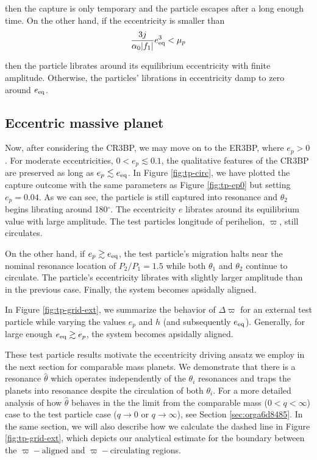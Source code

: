 \documentclass[usenatbib,twocolumn]{mnras}
\DeclarePairedDelimiter{\abs}{|}{|}
\begin{document}
\noindent
then the capture is only temporary and the particle escapes after a
long enough time. On the other hand, if the eccentricity is smaller
than
\begin{equation}
  \frac{3j}{\alpha_0 \abs{f_1}}e_{\rm eq}^3 < \mu_p
\end{equation}

\noindent
then the particle librates around its equilibrium eccentricity with
finite amplitude. Otherwise, the particles' librations in eccentricity
damp to zero around \(e_{\rm eq}\).


\subsection{Eccentric massive planet}
\label{sec:org04eb4c8}
Now, after considering the
CR3BP, we may move on to the ER3BP, where \(e_p>0\).  For moderate
eccentricities, \(0<e_p\lesssim 0.1\), the qualitative features of the
CR3BP are preserved as long as \(e_p \lesssim e_{\rm eq}\). In Figure
\ref{fig:tp-circ}, we have plotted the capture outcome with the same
parameters as Figure \ref{fig:tp-ep0} but setting \(e_p = 0.04\). As we
can see, the particle is still captured into resonance and \(\theta_2\)
begins librating around 180\(^\circ\). The eccentricity \(e\) librates
around its equilibrium value with large amplitude. The test particles
longitude of perihelion, \(\varpi\), still circulates.

On the other hand, if \(e_p \gtrsim e_{\rm eq}\), the test particle's
migration halts near the nominal resonance location of \(P_2/P_1=1.5\)
while both \(\theta_1\) and \(\theta_2\) continue to circulate. The particle's
eccentricity librates with slightly larger amplitude than
in the previous case. Finally, the system becomes apsidally aligned.

In Figure \ref{fig:tp-grid-ext}, we summarize the behavior of
\(\Delta\varpi\) for an external test particle while
varying the values \(e_p\) and \(h\) (and subsequently \(e_{\rm
eq}\)). Generally, for large enough \(e_{\rm eq}\gtrsim e_p\), the system
becomes apsidally aligned.

These test particle results motivate the eccentricity driving ansatz
we employ in the next section for comparable mass planets. We
demonstrate that there is a resonance \(\hat\theta\) which operates
independently of the \(\theta_i\) resonances and traps the planets into
resonance despite the circulation of both \(\theta_i\). For a more detailed
analysis of how \(\hat\theta\) behaves in the the limit from the comparable mass
(\(0<q<\infty\)) case to the test particle case (\(q\to0\) or
\(q\to\infty\)), see Section \ref{sec:orga6d8485}. In the same section,
we will also describe how we calculate the dashed line in Figure
\ref{fig:tp-grid-ext}, which depicts our analytical estimate for the
boundary between the \(\varpi-\text{aligned}\) and
\(\varpi-\text{circulating}\) regions.
\end{document}
